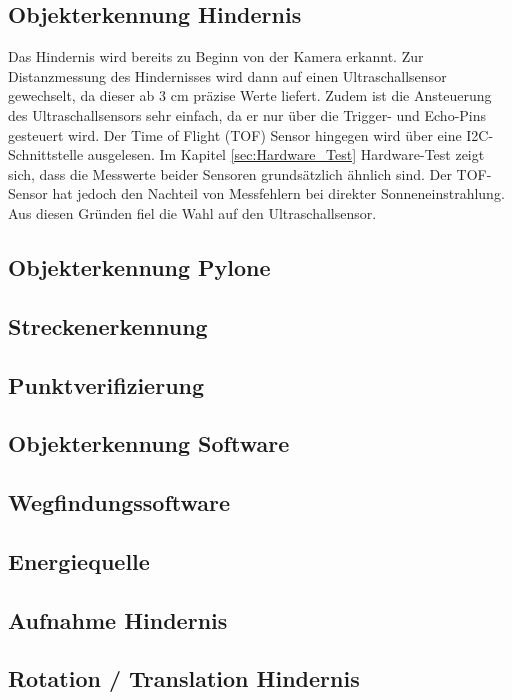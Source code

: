 \documentclass[../main.tex]{subfiles}
\begin{document}
\subsection{Objekterkennung Hindernis}
Das Hindernis wird bereits zu Beginn von der Kamera erkannt. Zur Distanzmessung des Hindernisses wird dann auf einen Ultraschallsensor gewechselt, da dieser ab 3 cm präzise Werte liefert. Zudem ist die Ansteuerung des Ultraschallsensors sehr einfach, da er nur über die Trigger- und Echo-Pins gesteuert wird. Der Time of Flight (TOF) Sensor hingegen wird über eine I2C-Schnittstelle ausgelesen. Im Kapitel \ref{sec:Hardware_Test} Hardware-Test zeigt sich, dass die Messwerte beider Sensoren grundsätzlich ähnlich sind. Der TOF-Sensor hat jedoch den Nachteil von Messfehlern bei direkter Sonneneinstrahlung. Aus diesen Gründen fiel die Wahl auf den Ultraschallsensor.








\subsection{Objekterkennung Pylone}



\subsection{Streckenerkennung}


\subsection{Punktverifizierung}


\subsection{Objekterkennung Software}

\subsection{Wegfindungssoftware}


\subsection{Energiequelle}


\subsection{Aufnahme Hindernis}



\subsection{Rotation / Translation Hindernis}
\end{document}
